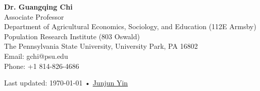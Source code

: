\documentclass[11pt, a4paper]{article}
\begin{document}
\textbf{Dr. Guangqing Chi}\\
Associate Professor\\
Department of Agricultural Economics, Sociology, and Education (112E Armsby)\\
Population Research Institute (803 Oswald)\\
The Pennsylvania State University, University Park, PA 16802\\
Email: gchi@psu.edu\\
Phone: +1 814-826-4686
\vfill{}

\begin{center}
{\scriptsize  Last updated: \today\- •\- 
\href{https://yinjunjun.github.io}{Junjun Yin}}
\end{center}
\end{document}
